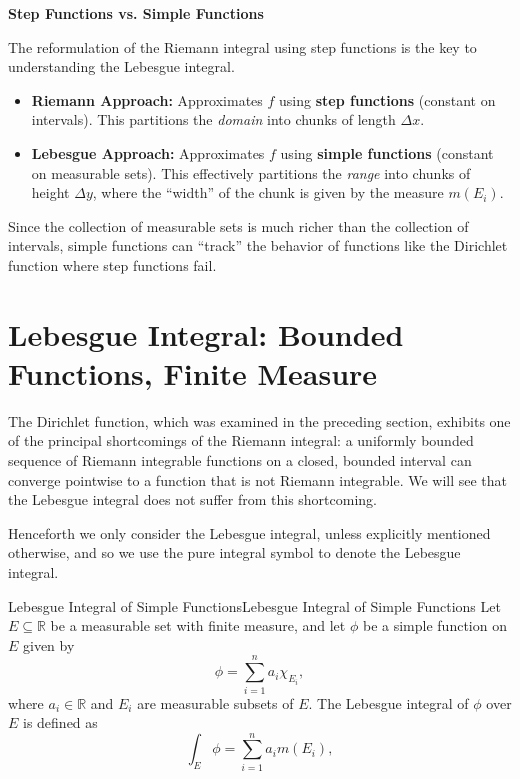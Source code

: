 \documentclass[../main.tex]{subfiles}
\begin{document}
\begin{remark}
	\textbf{Step Functions vs. Simple Functions}

	The reformulation of the Riemann integral using step functions is the key to understanding the Lebesgue integral.
	\begin{itemize}
		\item \textbf{Riemann Approach:} Approximates $f$ using \textbf{step functions} (constant on intervals). This partitions the \textit{domain} into chunks of length $\Delta x$.
		\item \textbf{Lebesgue Approach:} Approximates $f$ using \textbf{simple functions} (constant on measurable sets). This effectively partitions the \textit{range} into chunks of height $\Delta y$, where the ``width'' of the chunk is given by the measure $m(E_i)$.
	\end{itemize}
	Since the collection of measurable sets is much richer than the collection of intervals, simple functions can ``track'' the behavior of functions like the Dirichlet function where step functions fail.
\end{remark}

\section{Lebesgue Integral: Bounded Functions, Finite Measure}

The Dirichlet function, which was examined in the preceding section, exhibits one of the principal shortcomings of the Riemann integral: a uniformly bounded sequence of Riemann integrable functions on a closed, bounded interval can converge pointwise to a function that is not Riemann integrable. We will see that the Lebesgue integral does not suffer from this shortcoming.

Henceforth we only consider the Lebesgue integral, unless explicitly mentioned otherwise, and so we use the pure integral symbol to denote the Lebesgue integral.

\begin{definition}{Lebesgue Integral of Simple Functions}{Lebesgue Integral of Simple Functions}
	Let $E \subseteq \mathbb{R}$ be a measurable set with finite measure, and let $\phi$ be a simple function on $E$ given by
	\begin{equation*}
		\phi = \sum_{i=1}^{n} a_i \chi_{E_i},
	\end{equation*}
	where $a_i \in \mathbb{R}$ and $E_i$ are measurable subsets of $E$. The Lebesgue integral of $\phi$ over $E$ is defined as
	\begin{equation}
		\int_E \phi = \sum_{i=1}^{n} a_i m(E_i),
	\end{equation}
\end{definition}
\end{document}
